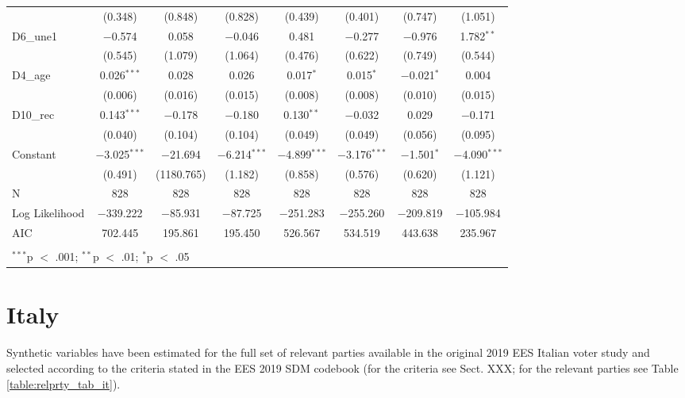 \documentclass[
]{article}
\begin{document}
\begin{table}[!htbp]
\begin{tabular}{@{\extracolsep{5pt}}lccccccc}
  & (0.348) & (0.848) & (0.828) & (0.439) & (0.401) & (0.747) & (1.051) \\ 
  D6\_une1 & $-$0.574 & 0.058 & $-$0.046 & 0.481 & $-$0.277 & $-$0.976 & 1.782$^{**}$ \\ 
  & (0.545) & (1.079) & (1.064) & (0.476) & (0.622) & (0.749) & (0.544) \\ 
  D4\_age & 0.026$^{***}$ & 0.028 & 0.026 & 0.017$^{*}$ & 0.015$^{*}$ & $-$0.021$^{*}$ & 0.004 \\ 
  & (0.006) & (0.016) & (0.015) & (0.008) & (0.008) & (0.010) & (0.015) \\ 
  D10\_rec & 0.143$^{***}$ & $-$0.178 & $-$0.180 & 0.130$^{**}$ & $-$0.032 & 0.029 & $-$0.171 \\ 
  & (0.040) & (0.104) & (0.104) & (0.049) & (0.049) & (0.056) & (0.095) \\ 
  Constant & $-$3.025$^{***}$ & $-$21.694 & $-$6.214$^{***}$ & $-$4.899$^{***}$ & $-$3.176$^{***}$ & $-$1.501$^{*}$ & $-$4.090$^{***}$ \\ 
  & (0.491) & (1180.765) & (1.182) & (0.858) & (0.576) & (0.620) & (1.121) \\ 
 N & 828 & 828 & 828 & 828 & 828 & 828 & 828 \\ 
Log Likelihood & $-$339.222 & $-$85.931 & $-$87.725 & $-$251.283 & $-$255.260 & $-$209.819 & $-$105.984 \\ 
AIC & 702.445 & 195.861 & 195.450 & 526.567 & 534.519 & 443.638 & 235.967 \\ 
\hline \\[-1.8ex] 
\multicolumn{8}{l}{$^{***}$p $<$ .001; $^{**}$p $<$ .01; $^{*}$p $<$ .05} \\ 
\end{tabular} 
\end{table}

\clearpage

\newpage

\hypertarget{italy}{%
\section{Italy}\label{italy}}

Synthetic variables have been estimated for the full set of relevant parties available in the original
2019 EES Italian voter study and selected according to the criteria stated in the EES 2019 SDM codebook (for the criteria see Sect. XXX; for the relevant parties see Table \ref{table:relprty_tab_it}).
\end{document}
